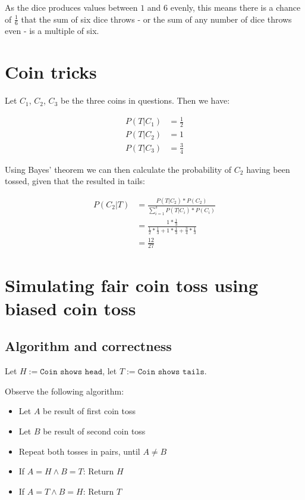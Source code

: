 \documentclass[a4paper]{scrreprt}
\begin{document}
As the dice produces values between $1$ and $6$ evenly, this means there is a
chance of $\frac{1}{6}$ that the sum of six dice throws - or the sum of any
number of dice throws even - is a multiple of six.

\section{Coin tricks}

Let $C_1$, $C_2$, $C_3$ be the three coins in questions. Then we have:

\begin{align*}
	P(T | C_1) & = \frac{1}{2} \\
	P(T | C_2) & = 1 \\
	P(T | C_3) & = \frac{3}{4}
\end{align*}

Using Bayes' theorem we can then calculate the probability of $C_2$ having been
tossed, given that the resulted in tails:

\begin{align*}
	P(C_2 | T) & = \frac{P(T | C_2) * P(C_2)}{\sum_{i=1}^3{P(T | C_i) * P(C_i)}} \\
		   & = \frac{1 * \frac{1}{3}}{\frac{1}{2} * \frac{1}{3} + 1 * \frac{1}{3} + \frac{3}{4} * \frac{1}{3}} \\
		   & = \frac{12}{27}
\end{align*}



\section{Simulating fair coin toss using biased coin toss}

\subsection{Algorithm and correctness}

Let $H := \texttt{Coin shows head}$, let $T := \texttt{Coin shows tails}$.

Observe the following algorithm:
\begin{itemize}
	\item Let $A$ be result of first coin toss
	\item Let $B$ be result of second coin toss
	\item Repeat both tosses in pairs, until $A \neq B$
	\item If $A = H \land B = T$: Return $H$
	\item If $A = T \land B = H$: Return $T$
\end{itemize}
\end{document}
